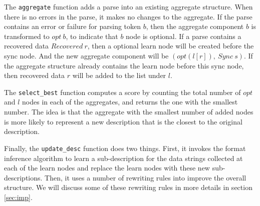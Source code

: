 {The {\tt aggregate} function adds a parse into an existing aggregate structure. When there is
no errors in the parse, it makes no changes to the aggregate. If the parse contains 
an error or failure for parsing token $b$, then the aggregate component 
$b$ is transformed to $opt~ b$, to indicate that $b$ node is optional. 
If a parse contains a recovered data $Recovered~ r$, then
a optional learn node will be created before the sync node. And the new aggregate component will be
$(opt (l [r]),~ Sync~ s)$. If the aggregate structure already contains the learn node before this
sync node, then recovered data $r$ will be added to the list under $l$.

The {\tt select\_best} function computes a score by counting the total number of $opt$ and $l$ nodes
in each of the aggregates, and returns the one with the smallest number. The idea is that the
aggregate with the smallest number of added nodes is more likely to represent a new description
that is the closest to the original description. 

Finally, the {\tt update\_desc} function does two things. First, it invokes the format inference
algorithm to learn a sub-description for the data strings collected at each of the learn nodes
and replace the learn nodes with these new sub-descriptions. Then, it uses a number of rewriting
rules into improve the overall structure. We will discuss some of these rewriting rules in more
details in section \ref{sec:imp}.

}%



